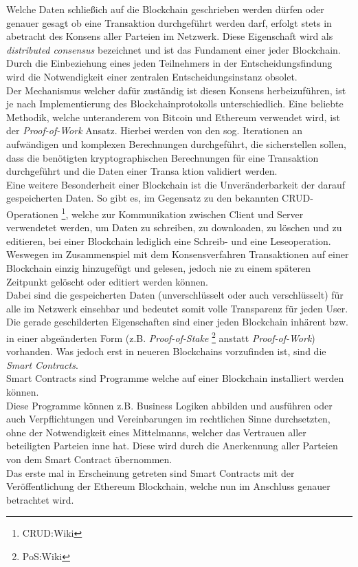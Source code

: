 Welche Daten schließich auf die Blockchain geschrieben werden dürfen oder genauer gesagt ob eine Transaktion durchgeführt werden darf, erfolgt stets in abetracht des Konsens aller Parteien im Netzwerk. Diese Eigenschaft wird als \textit{distributed consensus} bezeichnet und ist das Fundament einer jeder Blockchain. Durch die Einbeziehung eines jeden Teilnehmers in der Entscheidungsfindung wird die Notwendigkeit einer zentralen Entscheidungsinstanz obsolet. \\
Der Mechanismus welcher dafür zuständig ist diesen Konsens herbeizuführen, ist je nach Implementierung des Blockchainprotokolls unterschiedlich. Eine beliebte Methodik, welche unteranderem von Bitcoin und Ethereum verwendet wird, ist der  \textit{Proof-of-Work} Ansatz. Hierbei werden von den sog.  Iterationen an aufwändigen und komplexen Berechnungen durchgeführt, die sicherstellen sollen, dass die benötigten kryptographischen Berechnungen für eine Transaktion durchgeführt und die Daten einer Transa ktion validiert werden.\\
Eine weitere Besonderheit einer Blockchain ist die Unveränderbarkeit der darauf gespeicherten Daten. So gibt es, im Gegensatz zu den bekannten CRUD-Operationen \footnote{CRUD:Wiki}, welche zur Kommunikation zwischen Client und Server verwendetet werden, um Daten zu schreiben, zu downloaden, zu löschen und zu editieren, bei einer Blockchain lediglich eine Schreib- und eine Leseoperation. Weswegen im Zusammenspiel mit dem Konsensverfahren Transaktionen auf einer Blockchain einzig hinzugefügt und gelesen, jedoch nie zu einem späteren Zeitpunkt gelöscht oder editiert werden können. \\
Dabei sind die gespeicherten Daten (unverschlüsselt oder auch verschlüsselt) für alle im Netzwerk einsehbar und bedeutet somit volle Transparenz für jeden User. \\ 
Die gerade geschilderten Eigenschaften sind einer jeden Blockchain inhärent bzw. in einer abgeänderten Form (z.B. \textit{Proof-of-Stake} \footnote{PoS:Wiki} anstatt \textit{Proof-of-Work}) vorhanden. 
Was jedoch erst in neueren Blockchains vorzufinden ist, sind die \textit{Smart Contracts}.\\
Smart Contracts sind Programme welche auf einer Blockchain installiert werden können.\\
Diese Programme können z.B. Business Logiken abbilden und ausführen oder auch Verpflichtungen und Vereinbarungen im rechtlichen Sinne durchsetzten, ohne der Notwendigkeit eines Mittelmanns, welcher das Vertrauen aller beteiligten Parteien inne hat. Diese  wird durch die Anerkennung aller Parteien von dem Smart Contract übernommen. \\
Das erste mal in Erscheinung getreten sind Smart Contracts mit der Veröffentlichung der Ethereum Blockchain, welche nun im Anschluss genauer betrachtet wird.

